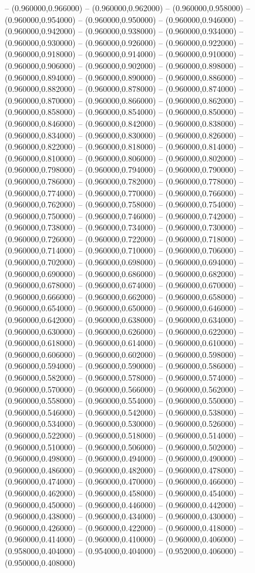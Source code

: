 -- (0.960000,0.966000) -- (0.960000,0.962000) -- (0.960000,0.958000) -- (0.960000,0.954000) -- (0.960000,0.950000) -- (0.960000,0.946000) -- (0.960000,0.942000) -- (0.960000,0.938000) -- (0.960000,0.934000) -- (0.960000,0.930000) -- (0.960000,0.926000) -- (0.960000,0.922000) -- (0.960000,0.918000) -- (0.960000,0.914000) -- (0.960000,0.910000) -- (0.960000,0.906000) -- (0.960000,0.902000) -- (0.960000,0.898000) -- (0.960000,0.894000) -- (0.960000,0.890000) -- (0.960000,0.886000) -- (0.960000,0.882000) -- (0.960000,0.878000) -- (0.960000,0.874000) -- (0.960000,0.870000) -- (0.960000,0.866000) -- (0.960000,0.862000) -- (0.960000,0.858000) -- (0.960000,0.854000) -- (0.960000,0.850000) -- (0.960000,0.846000) -- (0.960000,0.842000) -- (0.960000,0.838000) -- (0.960000,0.834000) -- (0.960000,0.830000) -- (0.960000,0.826000) -- (0.960000,0.822000) -- (0.960000,0.818000) -- (0.960000,0.814000) -- (0.960000,0.810000) -- (0.960000,0.806000) -- (0.960000,0.802000) -- (0.960000,0.798000) -- (0.960000,0.794000) -- (0.960000,0.790000) -- (0.960000,0.786000) -- (0.960000,0.782000) -- (0.960000,0.778000) -- (0.960000,0.774000) -- (0.960000,0.770000) -- (0.960000,0.766000) -- (0.960000,0.762000) -- (0.960000,0.758000) -- (0.960000,0.754000) -- (0.960000,0.750000) -- (0.960000,0.746000) -- (0.960000,0.742000) -- (0.960000,0.738000) -- (0.960000,0.734000) -- (0.960000,0.730000) -- (0.960000,0.726000) -- (0.960000,0.722000) -- (0.960000,0.718000) -- (0.960000,0.714000) -- (0.960000,0.710000) -- (0.960000,0.706000) -- (0.960000,0.702000) -- (0.960000,0.698000) -- (0.960000,0.694000) -- (0.960000,0.690000) -- (0.960000,0.686000) -- (0.960000,0.682000) -- (0.960000,0.678000) -- (0.960000,0.674000) -- (0.960000,0.670000) -- (0.960000,0.666000) -- (0.960000,0.662000) -- (0.960000,0.658000) -- (0.960000,0.654000) -- (0.960000,0.650000) -- (0.960000,0.646000) -- (0.960000,0.642000) -- (0.960000,0.638000) -- (0.960000,0.634000) -- (0.960000,0.630000) -- (0.960000,0.626000) -- (0.960000,0.622000) -- (0.960000,0.618000) -- (0.960000,0.614000) -- (0.960000,0.610000) -- (0.960000,0.606000) -- (0.960000,0.602000) -- (0.960000,0.598000) -- (0.960000,0.594000) -- (0.960000,0.590000) -- (0.960000,0.586000) -- (0.960000,0.582000) -- (0.960000,0.578000) -- (0.960000,0.574000) -- (0.960000,0.570000) -- (0.960000,0.566000) -- (0.960000,0.562000) -- (0.960000,0.558000) -- (0.960000,0.554000) -- (0.960000,0.550000) -- (0.960000,0.546000) -- (0.960000,0.542000) -- (0.960000,0.538000) -- (0.960000,0.534000) -- (0.960000,0.530000) -- (0.960000,0.526000) -- (0.960000,0.522000) -- (0.960000,0.518000) -- (0.960000,0.514000) -- (0.960000,0.510000) -- (0.960000,0.506000) -- (0.960000,0.502000) -- (0.960000,0.498000) -- (0.960000,0.494000) -- (0.960000,0.490000) -- (0.960000,0.486000) -- (0.960000,0.482000) -- (0.960000,0.478000) -- (0.960000,0.474000) -- (0.960000,0.470000) -- (0.960000,0.466000) -- (0.960000,0.462000) -- (0.960000,0.458000) -- (0.960000,0.454000) -- (0.960000,0.450000) -- (0.960000,0.446000) -- (0.960000,0.442000) -- (0.960000,0.438000) -- (0.960000,0.434000) -- (0.960000,0.430000) -- (0.960000,0.426000) -- (0.960000,0.422000) -- (0.960000,0.418000) -- (0.960000,0.414000) -- (0.960000,0.410000) -- (0.960000,0.406000) -- (0.958000,0.404000) -- (0.954000,0.404000) -- (0.952000,0.406000) -- (0.950000,0.408000) 